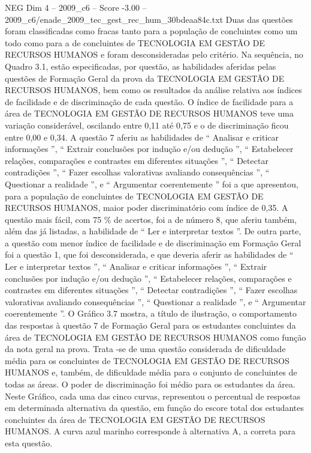 \begin{textsample}{NEG Dim 4 – 2009\_c6 – Score -3.00 – 2009\_c6/enade\_2009\_tec\_gest\_rec\_hum\_30bdeaa84c.txt}
Duas das questões foram classificadas como fracas tanto para a população de concluintes como um todo como para a de concluintes de TECNOLOGIA EM GESTÃO DE RECURSOS HUMANOS e foram desconsideradas pelo critério.
Na sequência, no Quadro 3.1, estão especificadas, por questão, as habilidades aferidas pelas questões de Formação Geral da prova da TECNOLOGIA EM GESTÃO DE RECURSOS HUMANOS, bem como os resultados da análise relativa aos índices de facilidade e de discriminação de cada questão.
O índice de facilidade para a área de TECNOLOGIA EM GESTÃO DE RECURSOS HUMANOS teve uma variação considerável, oscilando entre 0,11 até 0,75 e o de discriminação ficou entre 0,00 e 0,34.
A questão 7 aferiu as habilidades de “ Analisar e criticar informações ”, “ Extrair conclusões por indução e/ou dedução ”, “ Estabelecer relações, comparações e contrastes em diferentes situações ”, “ Detectar contradições ”, “ Fazer escolhas valorativas avaliando consequências ”, “ Questionar a realidade ”, e “ Argumentar coerentemente ” foi a que apresentou, para a população de concluintes de TECNOLOGIA EM GESTÃO DE RECURSOS HUMANOS, maior poder discriminatório com índice de 0,35.
A questão mais fácil, com 75 \% de acertos, foi a de número 8, que aferiu também, além das já listadas, a habilidade de “ Ler e interpretar textos ”.
De outra parte, a questão com menor índice de facilidade e de discriminação em Formação Geral foi a questão 1, que foi desconsiderada, e que deveria aferir as habilidades de “ Ler e interpretar textos ”, “ Analisar e criticar informações ”, “ Extrair conclusões por indução e/ou dedução ”, “ Estabelecer relações, comparações e contrastes em diferentes situações ”, “ Detectar contradições ”, “ Fazer escolhas valorativas avaliando consequências ”, “ Questionar a realidade ”, e “ Argumentar coerentemente ”.
O Gráfico 3.7 mostra, a título de ilustração, o comportamento das respostas à questão 7 de Formação Geral para os estudantes concluintes da área de TECNOLOGIA EM GESTÃO DE RECURSOS HUMANOS como função da nota geral na prova.
Trata -se de uma questão considerada de dificuldade média para os concluintes de TECNOLOGIA EM GESTÃO DE RECURSOS HUMANOS e, também, de dificuldade média para o conjunto de concluintes de todas as áreas.
O poder de discriminação foi médio para os estudantes da área.
Neste Gráfico, cada uma das cinco curvas, representou o percentual de respostas em determinada alternativa da questão, em função do escore total dos estudantes concluintes da área de TECNOLOGIA EM GESTÃO DE RECURSOS HUMANOS.
A curva azul marinho corresponde à alternativa A, a correta para esta questão.

\end{textsample}
